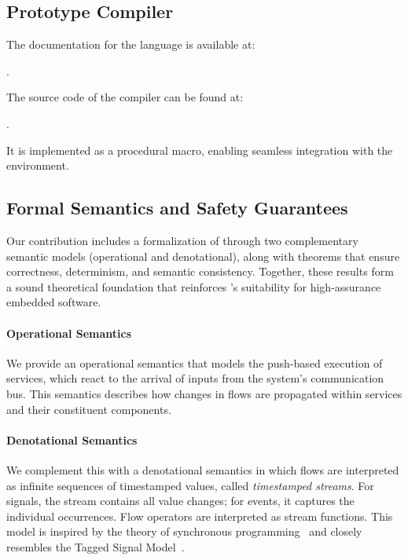 \subsection{Prototype Compiler}
\label{sec:intro:contrib:proto}

The documentation for the language is available at:
\begin{center}
    \URLgrbook .
\end{center}
%
The source code of the \GRust compiler can be found at:
\begin{center}
    \URLgrust .
\end{center}
It is implemented as a \Rust procedural macro, enabling seamless integration with the \Rust
environment.
%

\subsection{Formal Semantics and Safety Guarantees}
\label{sec:intro:contrib:semantics}

Our contribution includes a formalization of \GRust through two complementary semantic models
(operational and denotational), along with theorems that ensure correctness, determinism, and
semantic consistency. Together, these results form a sound theoretical foundation that reinforces
\GRust's suitability for high-assurance embedded software.

\paragraph{Operational Semantics}
\label{sec:intro:contrib:semantics:opsem}

We provide an operational semantics that models the push-based execution of \GRust services, which
react to the arrival of inputs from the system's communication bus. This semantics describes how
changes in flows are propagated within services and their constituent components.

\paragraph{Denotational Semantics}
\label{sec:intro:contrib:semantics:denot}

We complement this with a denotational semantics in which flows are interpreted as infinite
sequences of timestamped values, called \emph{timestamped streams}. For signals, the stream contains
all value changes; for events, it captures the individual occurrences. Flow operators are
interpreted as stream functions. This model is inspired by the theory of synchronous
programming~\cite{DBLP:journals/tecs/BourkePP23} and closely resembles the Tagged Signal
Model~\cite{DBLP:journals/tcad/LeeS98}.

